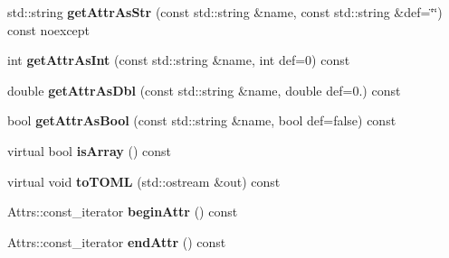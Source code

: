 \begin{DoxyCompactItemize}
\item 
\hypertarget{classtheoria_1_1config_1_1Config_a45702e009219115ee14b11ad1f0a851a}{std\+::string {\bfseries get\+Attr\+As\+Str} (const std\+::string \&name, const std\+::string \&def=\char`\"{}\char`\"{}) const noexcept}\label{classtheoria_1_1config_1_1Config_a45702e009219115ee14b11ad1f0a851a}

\item 
\hypertarget{classtheoria_1_1config_1_1Config_acd4660c288694e027f9ed14a89895b5e}{int {\bfseries get\+Attr\+As\+Int} (const std\+::string \&name, int def=0) const }\label{classtheoria_1_1config_1_1Config_acd4660c288694e027f9ed14a89895b5e}

\item 
\hypertarget{classtheoria_1_1config_1_1Config_a7607c7ba217b44f91417acaf98936478}{double {\bfseries get\+Attr\+As\+Dbl} (const std\+::string \&name, double def=0.) const }\label{classtheoria_1_1config_1_1Config_a7607c7ba217b44f91417acaf98936478}

\item 
\hypertarget{classtheoria_1_1config_1_1Config_a9015778d5985ada7d8045e5dfa8e69f6}{bool {\bfseries get\+Attr\+As\+Bool} (const std\+::string \&name, bool def=false) const }\label{classtheoria_1_1config_1_1Config_a9015778d5985ada7d8045e5dfa8e69f6}

\item 
\hypertarget{classtheoria_1_1config_1_1Config_a2d8c81f013dd5e87e43f1f4a21162201}{virtual bool {\bfseries is\+Array} () const }\label{classtheoria_1_1config_1_1Config_a2d8c81f013dd5e87e43f1f4a21162201}

\item 
\hypertarget{classtheoria_1_1config_1_1Config_aa8d858b3ab9b56a8c566b7e890843e08}{virtual void {\bfseries to\+T\+O\+M\+L} (std\+::ostream \&out) const }\label{classtheoria_1_1config_1_1Config_aa8d858b3ab9b56a8c566b7e890843e08}

\item 
\hypertarget{classtheoria_1_1config_1_1Config_a26d27af57132772eae7ff0c3b2311556}{Attrs\+::const\+\_\+iterator {\bfseries begin\+Attr} () const }\label{classtheoria_1_1config_1_1Config_a26d27af57132772eae7ff0c3b2311556}

\item 
\hypertarget{classtheoria_1_1config_1_1Config_a9f037f8ab8d97a71f066c2f359574d68}{Attrs\+::const\+\_\+iterator {\bfseries end\+Attr} () const }\label{classtheoria_1_1config_1_1Config_a9f037f8ab8d97a71f066c2f359574d68}

\end{DoxyCompactItemize}
